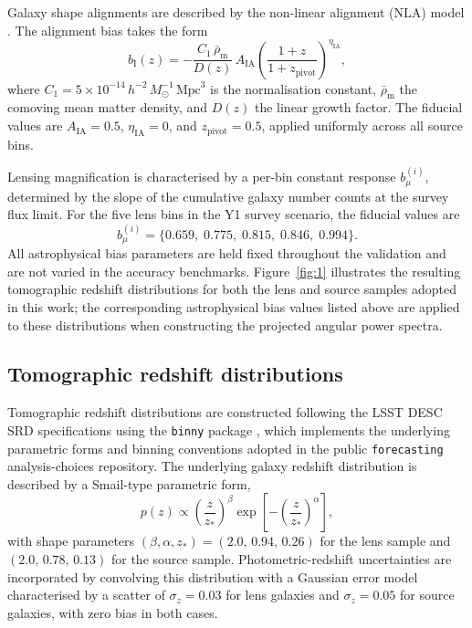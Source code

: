Galaxy shape alignments are described by the non-linear alignment (NLA) model \citep{2015PhR...558....1T, 2019PhRvD.100j3506B}. The alignment bias takes the form
\begin{equation} \label{eq:3.2}
    b_{\mathrm{I}}(z) = -\frac{C_1 \, \bar{\rho}_{\mathrm{m}}}{D(z)} \, A_{\mathrm{IA}} \left(\frac{1+z}{1+z_{\mathrm{pivot}}}\right)^{\eta_{\mathrm{IA}}},
\end{equation}
where \(C_1 = 5 \times 10^{-14}\,h^{-2}\,M_\odot^{-1}\,\mathrm{Mpc}^3\) is the normalisation constant, \(\bar{\rho}_{\mathrm{m}}\) the comoving mean matter density, and \(D(z)\) the linear growth factor. The fiducial values are \(A_{\mathrm{IA}} = 0.5\), \(\eta_{\mathrm{IA}} = 0\), and \(z_{\mathrm{pivot}} = 0.5\), applied uniformly across all source bins.

Lensing magnification is characterised by a per-bin constant response \(b_\mu^{(i)}\), determined by the slope of the cumulative galaxy number counts at the survey flux limit. For the five lens bins in the Y1 survey scenario, the fiducial values are
\begin{equation} \label{eq:3.3}
    b_\mu^{(i)} = \{0.659,\; 0.775,\; 0.815,\; 0.846,\; 0.994\}.
\end{equation}
All astrophysical bias parameters are held fixed throughout the validation and are not varied in the accuracy benchmarks. Figure~\ref{fig:1} illustrates the resulting tomographic redshift distributions for both the lens and source samples adopted in this work; the corresponding astrophysical bias values listed above are applied to these distributions when constructing the projected angular power spectra.

\subsection{Tomographic redshift distributions} \label{sec:3.3}

Tomographic redshift distributions are constructed following the LSST DESC SRD specifications using the \texttt{binny} package \citep{sarcevic2026binny}, which implements the underlying parametric forms and binning conventions adopted in the public \texttt{forecasting} analysis-choices repository. The underlying galaxy redshift distribution is described by a Smail-type parametric form,
\begin{equation} \label{eq:3.4}
    p(z) \propto \left(\frac{z}{z_\ast}\right)^{\beta} \exp\!\left[-\left(\frac{z}{z_\ast}\right)^{\alpha}\right],
\end{equation}
with shape parameters \((\beta, \alpha, z_\ast) = (2.0,\, 0.94,\, 0.26)\) for the lens sample and \((2.0,\, 0.78,\, 0.13)\) for the source sample. Photometric-redshift uncertainties are incorporated by convolving this distribution with a Gaussian error model characterised by a scatter of \(\sigma_z = 0.03\) for lens galaxies and \(\sigma_z = 0.05\) for source galaxies, with zero bias in both cases.

